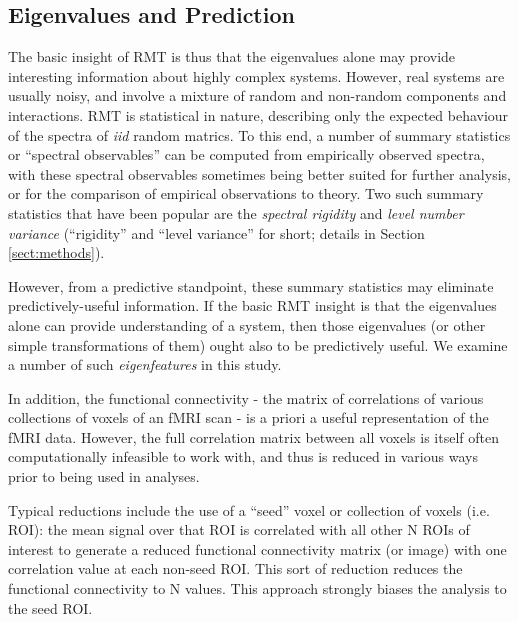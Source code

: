 \documentclass[12pt]{spieman}  %
\begin{document}
\begin{spacing}{2}
\subsection{Eigenvalues and Prediction}

The basic insight of RMT is thus that the eigenvalues alone may provide
interesting information about highly complex systems. However, real systems are
usually noisy, and involve a mixture of random and non-random components and
interactions. RMT is statistical in nature, describing only the expected
behaviour of the spectra of \textit{iid} random matrics. To this end, a number
of summary statistics or ``spectral observables''
\cite{mehtaRandomMatrices2004, guhrRandommatrixTheoriesQuantum1998a} can be
computed from empirically observed spectra, with these spectral observables
sometimes being better suited for further analysis, or for the comparison of
empirical observations to theory. Two such summary statistics that have been
popular\cite{santhanamStatisticsAtmosphericCorrelations2001,
jalanUncoveringRandomnessSuccess2014, matharooSpontaneousBackpainAlters2020,
bandyopadhyayUniversalityComplexNetworks2007,
agrawalQuantifyingRandomnessProtein2014, raiRandomnessPreservedPatterns2015,
sebaRandomMatrixAnalysis2003,wangSpectralPropertiesTemporal2015,
wangRandomMatrixTheory2016} are the \textit{spectral rigidity} and
\textit{level number variance} (``rigidity'' and ``level variance'' for short;
details in Section \ref{sect:methods}).

However, from a predictive standpoint, these summary statistics may eliminate
predictively-useful information. If the basic RMT insight is that the
eigenvalues alone can provide understanding of a system, then those eigenvalues
(or other simple transformations of them) ought also to be predictively
useful. We examine a number of such \textit{eigenfeatures} in this study.

In addition, the functional connectivity - the matrix of correlations of
various collections of voxels of an fMRI scan - is a priori a useful
representation of the fMRI data. However, the full correlation matrix between
all voxels is itself often computationally infeasible to work with, and thus is
reduced in various ways prior to being used in analyses.

Typical reductions include the use of a ``seed'' voxel or collection of voxels
(i.e. ROI): the mean signal over that ROI is correlated with all other N ROIs
of interest to generate a reduced functional connectivity matrix (or image)
with one correlation value at each non-seed ROI. This sort of reduction reduces
the functional connectivity to N values. This approach strongly biases the
analysis to the seed ROI.


\end{spacing}
\end{document}
